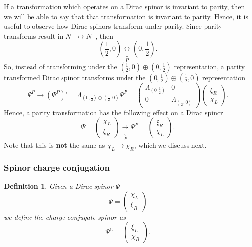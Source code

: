 \documentclass[11pt]{article}
\numberwithin{equation}{section}
\newtheorem{defn}{Definition}[section]
\begin{document}
If a transformation which operates on a Dirac spinor is invariant to parity, then we will be able to say that that transformation is invariant to parity. Hence, it is useful to observe how Dirac spinors transform under parity. Since parity transforms result in $N^+ \leftrightarrow N^-$, then
\begin{equation}
\left(\frac{1}{2}, 0\right) \underbrace{\leftrightarrow}_{P} \left(0, \frac{1}{2}\right).
\end{equation}
So, instead of transforming under the $(\frac{1}{2},0) \oplus (0, \frac{1}{2})$ representation, a parity transformed Dirac spinor transforms under the $(0, \frac{1}{2}) \oplus (\frac{1}{2},0)$ representation
\begin{equation}
\Psi^P \rightarrow (\Psi^P)' = \Lambda_{(0, \frac{1}{2}) \oplus (\frac{1}{2},0)} \Psi^P = \begin{pmatrix}
\Lambda_{(0, \frac{1}{2})} & 0 \\
0 & \Lambda_{(\frac{1}{2},0)} 
\end{pmatrix} \begin{pmatrix}
\xi_R \\
\chi_L
\end{pmatrix}.
\end{equation}
Hence, a parity transformation has the following effect on a Dirac spinor
\begin{equation}
\Psi = \begin{pmatrix}
\chi_L \\
\xi_R
\end{pmatrix} \underbrace{\rightarrow}_P
\Psi^P = \begin{pmatrix}
\xi_R \\
\chi_L
\end{pmatrix}.
\end{equation}
Note that this is \textbf{not} the same as $\chi_L \rightarrow \chi_R$, which we discuss next. 

\subsubsection{Spinor charge conjugation}
\begin{defn}
Given a Dirac spinor $\Psi$
\begin{equation}
\Psi = \begin{pmatrix}
\chi_L \\
\xi_R
\end{pmatrix}
\end{equation}
we define the charge conjugate spinor as 
\begin{equation}
\Psi^C = \begin{pmatrix}
\xi_L \\
\chi_R
\end{pmatrix}.
\end{equation}
\end{defn}
\end{document}
